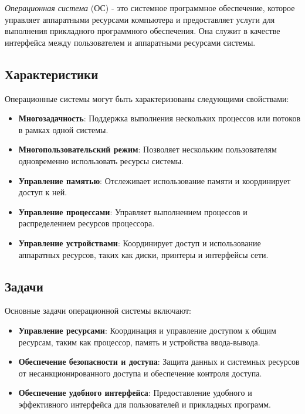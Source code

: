 \textit{Операционная система} (ОС) - это системное программное обеспечение, которое управляет аппаратными ресурсами компьютера и предоставляет услуги для выполнения прикладного программного обеспечения. Она служит в качестве интерфейса между пользователем и аппаратными ресурсами системы.

\subsection{Характеристики}

Операционные системы могут быть характеризованы следующими свойствами:

\begin{itemize}
\item \textbf{Многозадачность}: Поддержка выполнения нескольких процессов или потоков в рамках одной системы.
\item \textbf{Многопользовательский режим}: Позволяет нескольким пользователям одновременно использовать ресурсы системы.
\item \textbf{Управление памятью}: Отслеживает использование памяти и координирует доступ к ней.
\item \textbf{Управление процессами}: Управляет выполнением процессов и распределением ресурсов процессора.
\item \textbf{Управление устройствами}: Координирует доступ и использование аппаратных ресурсов, таких как диски, принтеры и интерфейсы сети.
\end{itemize}

\subsection{Задачи}

Основные задачи операционной системы включают:

\begin{itemize}
\item \textbf{Управление ресурсами}: Координация и управление доступом к общим ресурсам, таким как процессор, память и устройства ввода-вывода.
\item \textbf{Обеспечение безопасности и доступа}: Защита данных и системных ресурсов от несанкционированного доступа и обеспечение контроля доступа.
\item \textbf{Обеспечение удобного интерфейса}: Предоставление удобного и эффективного интерфейса для пользователей и прикладных программ.
\end{itemize}

